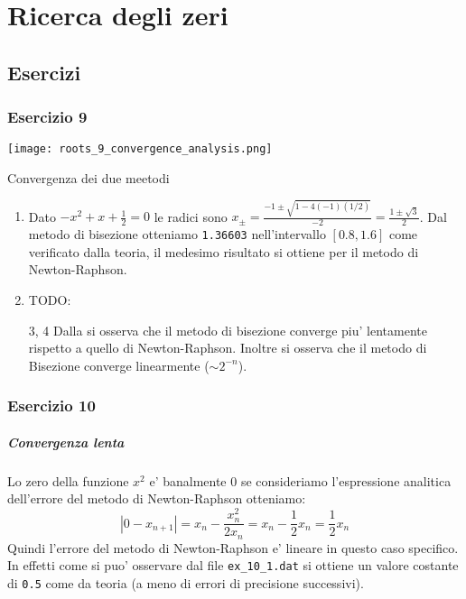\setchapterpreamble[u]{\margintoc}
\chapter{Ricerca degli zeri}



\section{Esercizi}


\subsection{Esercizio 9}

\begin{marginfigure}
	\texttt{[image: roots\_9\_convergence\_analysis.png]}
	\caption{Convergenza dei due meetodi}
	\label{fig:roots_ex_9}
\end{marginfigure}

\begin{enumerate}
	\item Dato $-x^2 + x + \frac{1}{2} = 0$ le radici sono $x_{\pm}=\frac{-1 \pm \sqrt{1-4(-1)(1/2)}}{-2}=\frac{1\pm\sqrt{3}}{2}$. Dal metodo di bisezione otteniamo \texttt{1.36603} nell'intervallo $[0.8,1.6]$ come verificato dalla teoria, il medesimo risultato si ottiene per il metodo di Newton-Raphson.
	\item TODO:
    \item[3, 4] Dalla  si osserva che il metodo di bisezione converge piu' lentamente rispetto a quello di Newton-Raphson. Inoltre si osserva che il metodo di Bisezione converge linearmente ($\sim 2^{-n}$).
\end{enumerate}


\subsection{Esercizio 10}

\paragraph{Convergenza lenta} Lo zero della funzione $x^2$ e' banalmente $0$ se
consideriamo l'espressione analitica dell'errore del metodo di Newton-Raphson otteniamo: 
\[
    |0-x_{n+1}| = x_n - \frac{x_n^2}{2 x_n} = x_n - \frac{1}{2} x_n = \frac{1}{2}x_n
\]
Quindi l'errore del metodo di Newton-Raphson e' lineare in questo caso specifico.
In effetti come si puo' osservare dal file \texttt{ex\_10\_1.dat} si ottiene un valore costante di \texttt{0.5} come da teoria (a meno di errori di precisione successivi).

